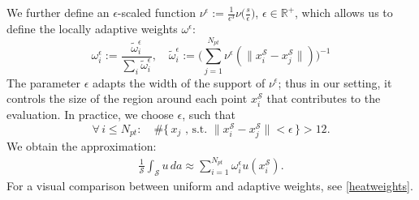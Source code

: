 \documentclass[draft,12pt,openany]{book}
\newcommand{\R}{\mathbb{R}}
\def\S{\mathcal{S}}
\theoremstyle{plainnormal}
\theoremstyle{remark}
\begin{document}
We further define an $\epsilon$-scaled function $\nu^\epsilon := \frac{1}{\epsilon ^3}\nu\big(\frac{s}{\epsilon}\big)$, $\epsilon \in \R^+$, which allows us to define the locally adaptive weights $\omega^\epsilon$:
$$\omega_i^\epsilon:= \frac{\tilde{\omega}_i^\epsilon}{\sum_i\tilde{\omega}_i^\epsilon}, \quad \tilde{\omega}_i^\epsilon:= \Bigg(\sum_{j=1}^{N_{pt}}\nu^\epsilon(\|x_i^\S-x_j^\S\|)\Bigg)^{-1}$$
The parameter $\epsilon$ adapts the width of the support of $\nu^\epsilon$; thus in our setting, it controls the size of the region around each point \( x_i^{\mathcal{S}} \) that contributes to the evaluation. In practice, we choose $\epsilon$, such that$$\forall\, i \leq N_{pt}:\quad\#\{\,x_j \text{ , s.t. } \|x_i^\S - x_j^\S\| < \epsilon\,\} > 12.$$ 
We obtain the approximation: 
\begin{align}\label{weighted_sum_heat}
    \frac{1}{\S}\int_\S u\, da\approx \sum_{i=1}^{N_{pt}}\omega_i^\epsilon u(x_i^\S).
\end{align}
For a visual comparison between uniform and adaptive weights, see \cref{heatweights}.
\end{document}
